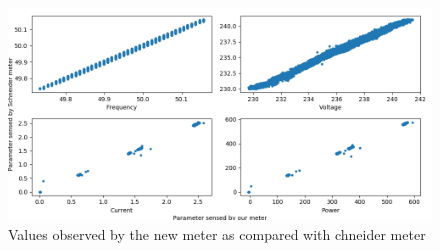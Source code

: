 \begin{figure} 
	\centering
	\includegraphics[width=1\linewidth]{images/fvcpcompare}
	\caption[Values observed by the new meter as compared with chneider meter]{Values observed by the new meter as compared with chneider meter}
	\label{fig:fvcpcompare}
\end{figure}
